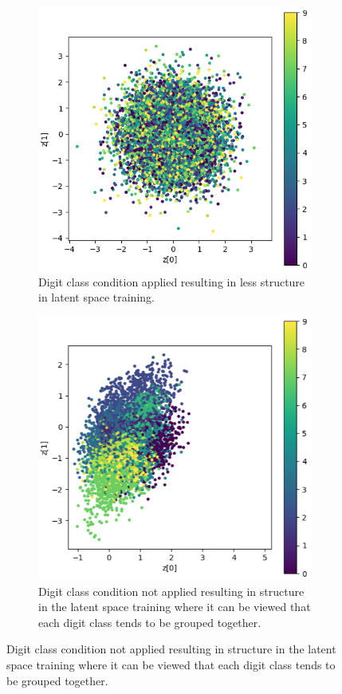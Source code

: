 \documentclass[fleqn,usenatbib]{mnras}
\begin{document}
\begin{figure}
    \begin{subfigure}[b]{\columnwidth}
        \centering
	    \includegraphics[width=\columnwidth]{Figure_29a.png}
        \caption{Digit class condition applied resulting in less structure in latent space training.}
        \label{fig:cond}
    \end{subfigure}
    
    \begin{subfigure}[b]{\columnwidth}
        \centering
	    \includegraphics[width=\columnwidth]{Figure_29b.png}
        \caption{Digit class condition not applied resulting in structure in the latent space training where it can be viewed that each digit class tends to be grouped together.}
        \label{fig:no cond}
    \end{subfigure}


\end{figure}
\end{document}
